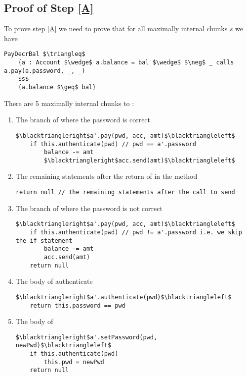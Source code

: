 \documentclass[11pt]{article} %
\theoremstyle{definition}
\begin{document}
\subsection{Proof of Step \ref{A}}
\label{ss:stepA}
To prove step \ref{A} we need to prove that for all maximally internal chunks $s$ we have
\begin{lstlisting}[language = Chainmail, frame = lines, mathescape = true]
PayDecrBal $\triangleq$
	{a : Account $\wedge$ a.balance = bal $\wedge$ $\neg$ _ calls a.pay(a.password, _, _)
	$s$
	{a.balance $\geq$ bal}
\end{lstlisting}
There are 5 maximally internal chunks to :
\begin{enumerate}
\item
\label{chunk:pay:correctPwd1}
The branch of  where the password is correct
\begin{lstlisting}[language = Chainmail, frame  = lines, mathescape = true]
$\blacktriangleright$a'.pay(pwd, acc, amt)$\blacktriangleleft$
	if this.authenticate(pwd) // pwd == a'.password
		balance -= amt
		$\blacktriangleright$acc.send(amt)$\blacktriangleleft$
\end{lstlisting}
\item
\label{chunk:pay:correctPwd2}
The remaining statements after the return of   in the  method
\begin{lstlisting}[language = Chainmail, frame  = lines, mathescape = true]
return null // the remaining statements after the call to send
\end{lstlisting}
\item
\label{chunk:pay:incorrectPwd}
The branch of  where the password is not correct
\begin{lstlisting}[language = Chainmail, frame  = lines, mathescape = true]
$\blacktriangleright$a'.pay(pwd, acc, amt)$\blacktriangleleft$
	if this.authenticate(pwd) // pwd != a'.password i.e. we skip the if statement
		balance -= amt
		acc.send(amt)
	return null
\end{lstlisting}
\item
\label{chunk:authenticate}
The body of authenticate
\begin{lstlisting}[language = Chainmail, frame  = lines, mathescape = true]
$\blacktriangleright$a'.authenticate(pwd)$\blacktriangleleft$
	return this.password == pwd
\end{lstlisting}
\item
\label{chunk:setPassword}
The body of 
\begin{lstlisting}[language = Chainmail, frame  = lines, mathescape = true]
$\blacktriangleright$a'.setPassword(pwd, newPwd)$\blacktriangleleft$
	if this.authenticate(pwd)
		this.pwd = newPwd
	return null
\end{lstlisting}
\end{enumerate}
\end{document}
